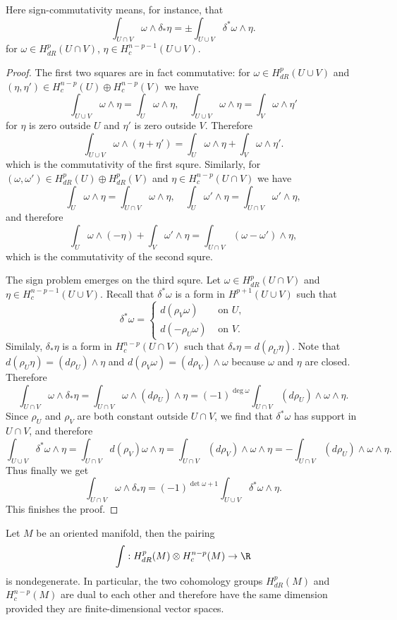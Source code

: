 Here sign-commutativity means, for instance, that
\[\int_{U\cap V}\omega\wedge\delta_*\eta=\pm\int_{U\cup V}\delta^*\omega\wedge\eta.\]
for $\omega\in H^p_{dR}(U\cap V)$, $\eta\in H^{n-p-1}_c(U\cup V)$.
\begin{proof}
The first two squares are in fact commutative: for $\omega\in H^p_{dR}(U\cup V)$ and $(\eta,\eta')\in H^{n-p}_c(U)\oplus H^{n-p}_c(V)$ we have
\[\int_{U\cup V}\omega\wedge\eta=\int_U\omega\wedge\eta,\quad \int_{U\cup V}\omega\wedge\eta=\int_V\omega\wedge\eta'\]
for $\eta$ is zero outside $U$ and $\eta'$ is zero outside $V$. Therefore
\[\int_{U\cup V}\omega\wedge(\eta+\eta')=\int_U\omega\wedge\eta+\int_V\omega\wedge\eta'.\]
which is the commutativity of the first squre. Similarly, for $(\omega,\omega')\in H^p_{dR}(U)\oplus H^p_{dR}(V)$ and $\eta\in H^{n-p}_c(U\cap V)$ we have
\[\int_{U}\omega\wedge\eta=\int_{U\cap V}\omega\wedge\eta,\quad \int_{U}\omega'\wedge\eta=\int_{U\cap V}\omega'\wedge\eta,\]
and therefore
\[\int_{U}\omega\wedge(-\eta)+\int_V\omega'\wedge\eta=\int_{U\cap V}(\omega-\omega')\wedge\eta,\]
which is the commutativity of the second squre.\par
The sign problem emerges on the third squre. Let $\omega\in H^p_{dR}(U\cap V)$ and $\eta\in H^{n-p-1}_c(U\cup V)$. Recall that $\delta^*\omega$ is a form in 
$H^{p+1}(U\cup V)$ such that
\[\delta^*\omega=\begin{cases}
d(\rho_V\omega)&\text{ on }U,\\
d(-\rho_U\omega)&\text{ on }V.
\end{cases}\]
Similaly, $\delta_*\eta$ is a form in $H^{n-p}_c(U\cap V)$ such that $\delta_*\eta=d(\rho_U\eta)$. Note that $d(\rho_U\eta)=(d\rho_U)\wedge\eta$ and 
$d(\rho_V\omega)=(d\rho_V)\wedge\omega$ because $\omega$ and $\eta$ are closed. Therefore
\[\int_{U\cap V}\omega\wedge\delta_*\eta=\int_{U\cap V}\omega\wedge(d\rho_U)\wedge\eta=(-1)^{\deg\omega}\int_{U\cap V}(d\rho_U)\wedge\omega\wedge\eta.\]
Since $\rho_U$ and $\rho_V$ are both constant outside $U\cap V$, we find that $\delta^*\omega$ has support in $U\cap V$, and therefore
\[\int_{U\cup V}\delta^*\omega\wedge\eta=\int_{U\cap V}d(\rho_V)\omega\wedge\eta=\int_{U\cap V}(d\rho_V)\wedge\omega\wedge\eta=-\int_{U\cap V}(d\rho_U)\wedge\omega\wedge\eta.\]
Thus finally we get
\[\int_{U\cap V}\omega\wedge\delta_*\eta=(-1)^{\det\omega+1}\int_{U\cup V}\delta^*\omega\wedge\eta.\]
This finishes the proof.
\end{proof}
\begin{proposition}
Let $M$ be an oriented manifold, then the pairing
\[\int:H^p_{dR}(M)\otimes H^{n-p}_c(M)\to\R\]
is nondegenerate. In particular, the two cohomology groups $H^p_{dR}(M)$ and $H^{n-p}_c(M)$ are dual to each other and therefore have the same dimension provided they are 
finite-dimensional vector spaces.
\end{proposition}

